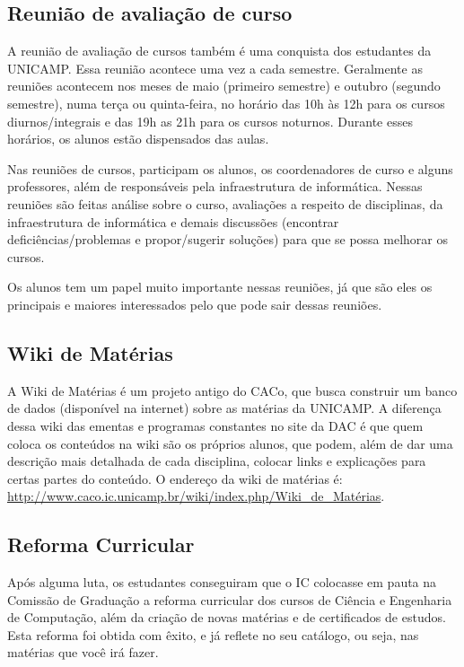 \documentclass[a4paper,10pt, twocolumn]{article}
\begin{document}
\subsection{Reunião de avaliação de curso}
A reunião de avaliação de cursos também é uma conquista dos estudantes da
UNICAMP. Essa reunião acontece uma vez a cada semestre. Geralmente as reuniões
acontecem nos meses de maio (primeiro semestre) e outubro (segundo semestre),
numa terça ou quinta-feira, no horário das 10h às 12h para os cursos
diurnos/integrais e das 19h as 21h para os cursos noturnos. Durante esses
horários, os alunos estão dispensados das aulas.

Nas reuniões de cursos, participam os alunos, os coordenadores de curso e alguns
professores, além de responsáveis pela infraestrutura de informática. Nessas
reuniões são feitas análise sobre o curso, avaliações a respeito de disciplinas,
da infraestrutura de informática e demais discussões (encontrar
deficiências/problemas e propor/sugerir soluções) para que se possa melhorar os
cursos.

Os alunos tem um papel muito importante nessas reuniões, já que são eles os
principais e maiores interessados pelo que pode sair dessas reuniões.

\subsection{Wiki de Matérias}
A Wiki de Matérias é um projeto antigo do CACo, que busca construir um banco de
dados (disponível na internet) sobre as matérias da UNICAMP. A diferença dessa
wiki das ementas e programas constantes no site da DAC é que quem coloca os
conteúdos na wiki são os próprios alunos, que podem, além de dar uma descrição
mais detalhada de cada disciplina, colocar links e explicações para certas
partes do conteúdo. O endereço da wiki de matérias é:
\url{http://www.caco.ic.unicamp.br/wiki/index.php/Wiki_de_Matérias}.

\subsection{Reforma Curricular}
Após alguma luta, os estudantes conseguiram que o IC colocasse em pauta na
Comissão de Graduação a reforma curricular dos cursos de Ciência e Engenharia de
Computação, além da criação de novas matérias e de certificados de estudos. Esta
reforma foi obtida com êxito, e já reflete no seu catálogo, ou seja, nas
matérias que você irá fazer.
\end{document}
